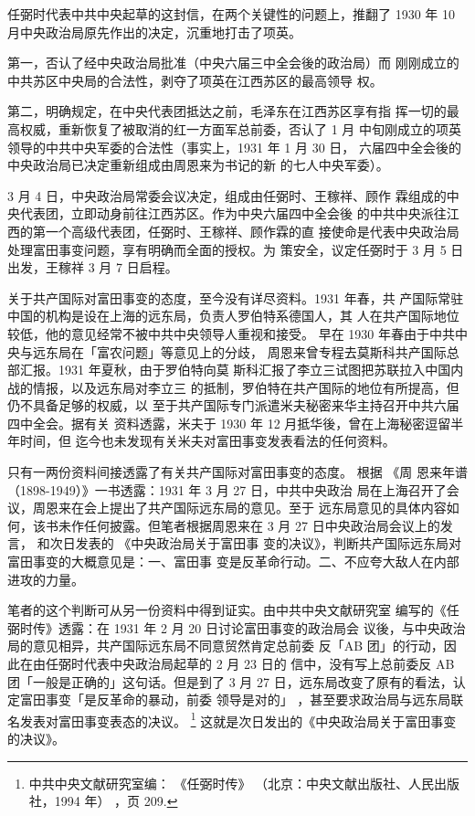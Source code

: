 任弼时代表中共中央起草的这封信，在两个关键性的问题上，推翻了
1930 年 10 月中央政治局原先作出的决定，沉重地打击了项英。

第一，否认了经中央政治局批准（中央六届三中全会後的政治局）而
刚刚成立的中共苏区中央局的合法性，剥夺了项英在江西苏区的最高领导
权。

第二，明确规定，在中央代表团抵达之前，毛泽东在江西苏区享有指
挥一切的最高权威，重新恢复了被取消的红一方面军总前委，否认了 1 月
中旬刚成立的项英领导的中共中央军委的合法性（事实上，1931 年 1 月
30 日，
六届四中全会後的中央政治局已决定重新组成由周恩来为书记的新
的七人中央军委）。

3 月 4 日，中央政治局常委会议决定，组成由任弼时、王稼祥、顾作
霖组成的中央代表团，立即动身前往江西苏区。作为中央六届四中全会後
的中共中央派往江西的第一个高级代表团，任弼时、王稼祥、顾作霖的直
接使命是代表中央政治局处理富田事变问题，享有明确而全面的授权。为
策安全，议定任弼时于 3 月 5 日出发，王稼祥 3 月 7 日启程。

关于共产国际对富田事变的态度，至今没有详尽资料。1931 年春，共
产国际常驻中国的机构是设在上海的远东局，负责人罗伯特系德国人，其
人在共产国际地位较低，他的意见经常不被中共中央领导人重视和接受。
早在 1930 年春由于中共中央与远东局在「富农问题」等意见上的分歧，
周恩来曾专程去莫斯科共产国际总部汇报。1931 年夏秋，由于罗伯特向莫
斯科汇报了李立三试图把苏联拉入中国内战的情报，以及远东局对李立三
的抵制，罗伯特在共产国际的地位有所提高，但仍不具备足够的权威，以
至于共产国际专门派遣米夫秘密来华主持召开中共六届四中全会。据有关
资料透露，米夫于 1930 年 12 月抵华後，曾在上海秘密逗留半年时间，但
迄今也未发现有关米夫对富田事变发表看法的任何资料。

只有一两份资料间接透露了有关共产国际对富田事变的态度。 根据
《周
恩来年谱（1898-1949）》一书透露：1931 年 3 月 27 日，中共中央政治
局在上海召开了会议，周恩来在会上提出了共产国际远东局的意见。至于
远东局意见的具体内容如何，该书未作任何披露。但笔者根据周恩来在 3
月 27 日中央政治局会议上的发言，
和次日发表的
《中央政治局关于富田事
变的决议》，判断共产国际远东局对富田事变的大概意见是：一、富田事
变是反革命行动。二、不应夸大敌人在内部进攻的力量。

笔者的这个判断可从另一份资料中得到证实。由中共中央文献研究室
编写的《任弼时传》透露：在 1931 年 2 月 20 日讨论富田事变的政治局会
议後，与中央政治局的意见相异，共产国际远东局不同意贸然肯定总前委
反「AB 团」的行动，因此在由任弼时代表中央政治局起草的 2 月 23 日的
信中，没有写上总前委反 AB 团「一般是正确的」这句话。但是到了 3 月
27 日，远东局改变了原有的看法，认定富田事变「是反革命的暴动，前委
领导是对的」 ，甚至要求政治局与远东局联名发表对富田事变表态的决议。
\footnote{ 中共中央文献研究室编：
《任弼时传》
（北京：中央文献出版社、人民出版社，1994 年）
，页 209.}
这就是次日发出的《中央政治局关于富田事变的决议》。

